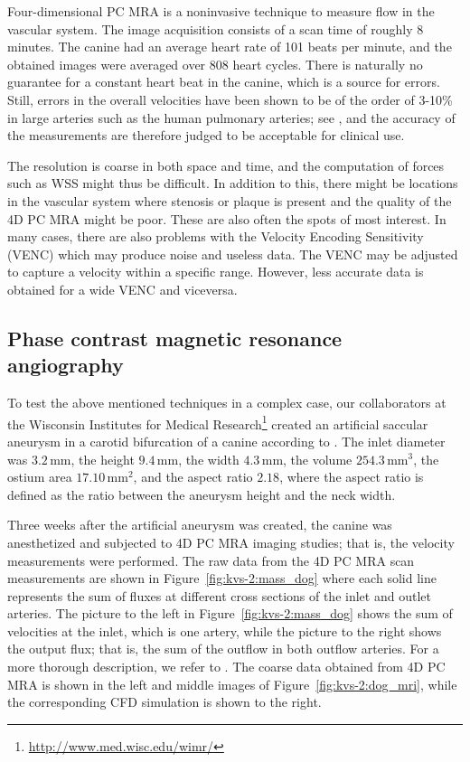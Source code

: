 Four-dimensional PC MRA is a noninvasive technique to measure flow in
the vascular system. The image acquisition consists of a scan time of
roughly 8 minutes. The canine had an average heart rate of 101 beats
per minute, and the obtained images were averaged over 808 heart
cycles. There is naturally no guarantee for a constant heart beat in
the canine, which is a source for errors. Still, errors in
the overall velocities have been shown to
be of the order of 3-10\% in large arteries such as the human pulmonary arteries;
see \citet{LotzMeierLeppertEtAl2002,EvansIwaiGristEtAl1993}, and
the accuracy of the measurements are therefore judged to be acceptable
for clinical use.

The resolution is coarse in both space and time, and the computation of
forces such as WSS might thus be difficult. In addition to this, there
might be locations in the vascular system where stenosis or plaque is
present and the quality of the 4D PC MRA might be poor. These are also
often the spots of most interest. In many cases, there are also
problems with the Velocity Encoding Sensitivity (VENC) which may
produce noise and useless data. The VENC may be adjusted to capture a
velocity within a specific range. However, less accurate data is
obtained for a wide VENC and vice\break versa.

\subsection{Phase contrast magnetic resonance angiography}

To test the above mentioned techniques in a complex case, our
collaborators at the Wisconsin Institutes for Medical
Research\footnote{\url{http://www.med.wisc.edu/wimr/}} created an
artificial saccular aneurysm in a carotid bifurcation of a canine
according to \citet{GermanBlack1965}. The inlet diameter was
$3.2\,\mathrm{mm}$, the height $9.4\,\mathrm{mm}$, the width
$4.3\,\mathrm{mm}$, the volume $254.3\,\mathrm{mm}^3$, the ostium area
$17.10\,\mathrm{mm}^2$, and the aspect ratio $2.18$, where the aspect
ratio is defined as the ratio between the aneurysm height and the neck
width.

Three weeks after the artificial aneurysm was created, the canine was
anesthetized and subjected to 4D PC MRA imaging studies; that is, the
velocity measurements were performed. The raw data from the 4D PC MRA
scan measurements are shown in Figure~\ref{fig:kvs-2:mass_dog} where
each solid line represents the sum of fluxes at different cross
sections of the inlet and outlet arteries. The picture to the left in
Figure~\ref{fig:kvs-2:mass_dog} shows the sum of velocities at the
inlet, which is one artery, while the picture to the right shows the
output flux; that is, the sum of the outflow in both outflow
arteries. For a more thorough description, we refer
to \citet{JiangJohnsonValen-SendstadEtAl2010}.  The coarse data
obtained from 4D PC MRA is shown in the left and middle images of
Figure~\ref{fig:kvs-2:dog_mri}, while the corresponding CFD simulation
is shown to the right.

